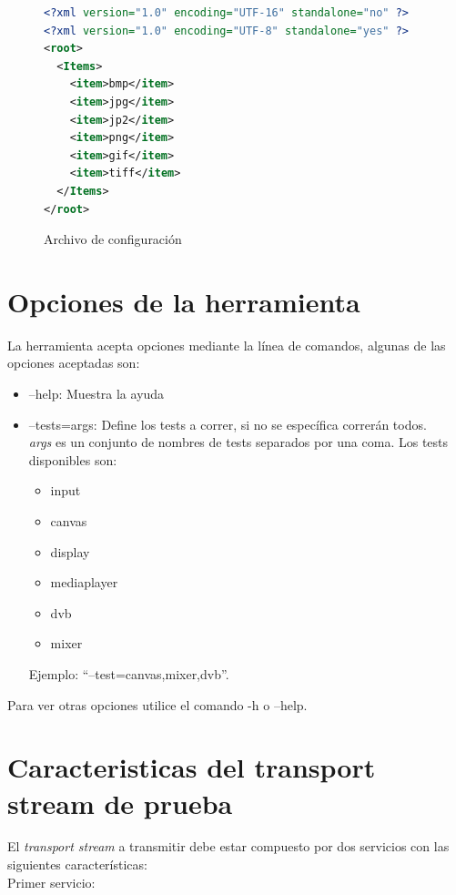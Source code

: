 \documentclass{article}
\begin{document}
\begin{figure}[h]
\centering
\begin{lstlisting}[language=xml]
<?xml version="1.0" encoding="UTF-16" standalone="no" ?>
<?xml version="1.0" encoding="UTF-8" standalone="yes" ?>
<root>
  <Items>
    <item>bmp</item>
    <item>jpg</item>
    <item>jp2</item>
    <item>png</item>
    <item>gif</item>
    <item>tiff</item>
  </Items>
</root>
\end{lstlisting}
\caption{Archivo de configuración}
\label{fig:conf_file}
\end{figure}

\FloatBarrier

\section{Opciones de la herramienta}
La herramienta acepta opciones mediante la línea de comandos, algunas de las opciones aceptadas son:
\begin{itemize}
\item --help: Muestra la ayuda
\item --tests=args: Define los tests a correr, si no se específica correrán todos. \\
\textit{args} es un conjunto de nombres de tests separados por una coma.
Los tests disponibles son:

\begin{itemize}
  \item input
  \item canvas
  \item display
  \item mediaplayer
  \item dvb
  \item mixer
\end{itemize}
Ejemplo: ``--test=canvas,mixer,dvb''.
\end{itemize}

Para ver otras opciones utilice el comando -h o --help.

\FloatBarrier

\section{Caracteristicas del transport stream de prueba}
\label{sec:ts}
El \textit{transport stream} a transmitir debe estar compuesto por dos servicios con las siguientes características:\\

Primer servicio:
\end{document}
